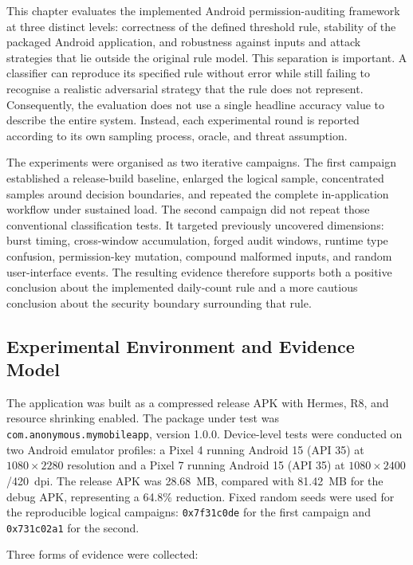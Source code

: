 This chapter evaluates the implemented Android permission-auditing framework at three distinct levels: correctness of the defined threshold rule, stability of the packaged Android application, and robustness against inputs and attack strategies that lie outside the original rule model. This separation is important. A classifier can reproduce its specified rule without error while still failing to recognise a realistic adversarial strategy that the rule does not represent. Consequently, the evaluation does not use a single headline accuracy value to describe the entire system. Instead, each experimental round is reported according to its own sampling process, oracle, and threat assumption.

The experiments were organised as two iterative campaigns. The first campaign established a release-build baseline, enlarged the logical sample, concentrated samples around decision boundaries, and repeated the complete in-application workflow under sustained load. The second campaign did not repeat those conventional classification tests. It targeted previously uncovered dimensions: burst timing, cross-window accumulation, forged audit windows, runtime type confusion, permission-key mutation, compound malformed inputs, and random user-interface events. The resulting evidence therefore supports both a positive conclusion about the implemented daily-count rule and a more cautious conclusion about the security boundary surrounding that rule.

\subsection{Experimental Environment and Evidence Model}

The application was built as a compressed release APK with Hermes, R8, and resource shrinking enabled. The package under test was \texttt{com.anonymous.mymobileapp}, version 1.0.0. Device-level tests were conducted on two Android emulator profiles: a Pixel 4 running Android 15 (API 35) at $1080 \times 2280$ resolution and a Pixel 7 running Android 15 (API 35) at $1080 \times 2400$/420~dpi. The release APK was 28.68~MB, compared with 81.42~MB for the debug APK, representing a 64.8\% reduction. Fixed random seeds were used for the reproducible logical campaigns: \texttt{0x7f31c0de} for the first campaign and \texttt{0x731c02a1} for the second.

Three forms of evidence were collected:

